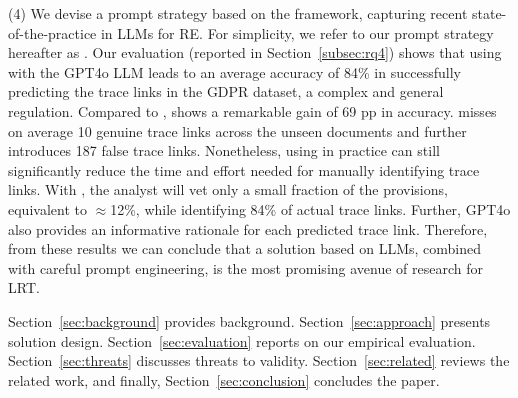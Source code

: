 
(4) We devise a prompt strategy based on the \RICE framework, capturing recent state-of-the-practice in LLMs for RE. For simplicity, we refer to our prompt strategy hereafter as \RICE. %
Our evaluation (reported in Section~\ref{subsec:rq4}) shows that using \RICE with the GPT4o LLM  leads to an average accuracy of 84\% in successfully predicting the trace links in the GDPR dataset, a complex and general regulation. Compared to \kashif, \RICE shows a remarkable gain of 69 pp in  accuracy. \RICE misses on average 10 genuine trace links across the unseen documents and further introduces 187 false trace links. Nonetheless, using \RICE in practice can still significantly reduce the time and effort needed for manually identifying trace links. With \RICE, the analyst will vet only a small fraction of the provisions, equivalent to $\approx$12\%, while identifying 84\% of actual trace links. Further, GPT4o also provides an informative rationale for each predicted trace link. Therefore, from these results we can conclude that a solution based on LLMs, combined with careful prompt engineering, is the most promising avenue of research for LRT.

 



 Section~\ref{sec:background} provides background. Section~\ref{sec:approach} presents solution design. Section~\ref{sec:evaluation} reports on our empirical evaluation. Section~\ref{sec:threats} discusses threats to validity. Section~\ref{sec:related} reviews the related work, and finally, Section~\ref{sec:conclusion} concludes the paper.
